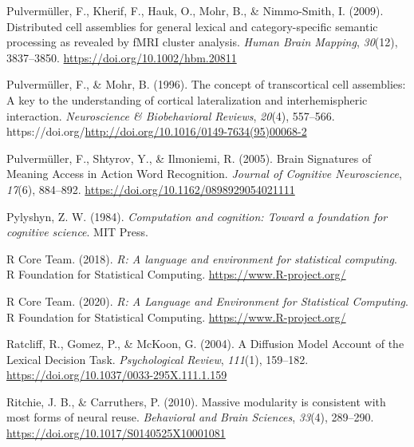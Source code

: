 \documentclass[
  a4paper,12pt,twoside,onecolumn,openright,final,oldfontcommands]{memoir}
\newlength{\cslhangindent}
\newlength{\cslentryspacingunit} %
\newenvironment{CSLReferences}[2] %
 {%
  \setlength{\parindent}{0pt}
  \ifodd #1
  \let\oldpar\par
  \def\par{\hangindent=\cslhangindent\oldpar}
  \fi
  \setlength{\parskip}{#2\cslentryspacingunit}
 }%
 {}
\begin{document}
\begin{CSLReferences}{1}{0}
\leavevmode{}%
Pulvermüller, F., Kherif, F., Hauk, O., Mohr, B., \& Nimmo-Smith, I. (2009). Distributed cell assemblies for general lexical and category-specific semantic processing as revealed by {fMRI} cluster analysis. \emph{Human Brain Mapping}, \emph{30}(12), 3837--3850. \url{https://doi.org/10.1002/hbm.20811}

\leavevmode{}%
Pulvermüller, F., \& Mohr, B. (1996). The concept of transcortical cell assemblies: A key to the understanding of cortical lateralization and interhemispheric interaction. \emph{Neuroscience \& Biobehavioral Reviews}, \emph{20}(4), 557--566. https://doi.org/\url{http://doi.org/10.1016/0149-7634(95)00068-2}

\leavevmode{}%
Pulvermüller, F., Shtyrov, Y., \& Ilmoniemi, R. (2005). Brain {Signatures} of {Meaning} {Access} in {Action} {Word} {Recognition}. \emph{Journal of Cognitive Neuroscience}, \emph{17}(6), 884--892. \url{https://doi.org/10.1162/0898929054021111}

\leavevmode{}%
Pylyshyn, Z. W. (1984). \emph{Computation and cognition: Toward a foundation for cognitive science}. MIT Press.

\leavevmode{}%
R Core Team. (2018). \emph{R: A language and environment for statistical computing}. R Foundation for Statistical Computing. \url{https://www.R-project.org/}

\leavevmode{}%
R Core Team. (2020). \emph{R: {A} {Language} and {Environment} for {Statistical} {Computing}}. R Foundation for Statistical Computing. \url{https://www.R-project.org/}

\leavevmode{}%
Ratcliff, R., Gomez, P., \& McKoon, G. (2004). A {Diffusion} {Model} {Account} of the {Lexical} {Decision} {Task}. \emph{Psychological Review}, \emph{111}(1), 159--182. \url{https://doi.org/10.1037/0033-295X.111.1.159}

\leavevmode{}%
Ritchie, J. B., \& Carruthers, P. (2010). Massive modularity is consistent with most forms of neural reuse. \emph{Behavioral and Brain Sciences}, \emph{33}(4), 289--290. \url{https://doi.org/10.1017/S0140525X10001081}


\end{CSLReferences}
\end{document}
